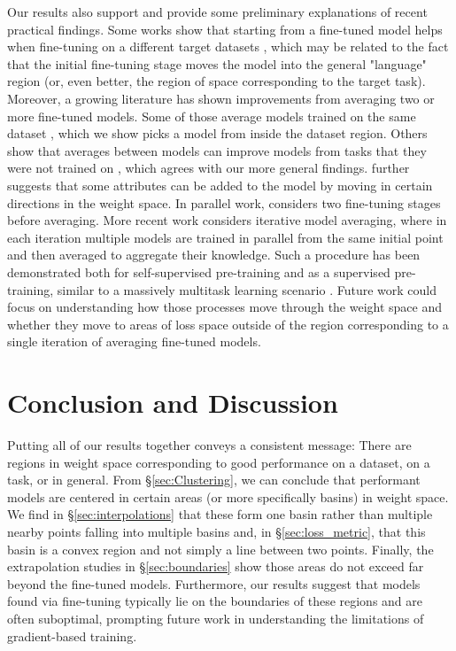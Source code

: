 \documentclass[nohyperref]{article}
\theoremstyle{plain}
\theoremstyle{definition}
\theoremstyle{remark}
\begin{document}
Our results also support and provide some preliminary explanations of recent practical findings. Some works show that starting from a fine-tuned model helps when fine-tuning on a different target datasets \citep{choshen2022start, Phang2018SentenceEO}, which may be related to the fact that the initial fine-tuning stage moves the model into the general "language" region (or, even better, the region of space corresponding to the target task). Moreover, a growing literature has shown improvements from averaging two or more fine-tuned models. Some of those average models trained on the same dataset \citep{Wortsman2022ModelSA,wortsman2022fi}, which we show picks a model from inside the dataset region. Others show that averages between models can improve models from tasks that they were not trained on \citep{choshen2022fusing,matena2021merging}, which agrees with our more general findings. \citet{ilharco2022editing} further suggests that some attributes can be added to the model by moving in certain directions in the weight space. In parallel work, \citet{Rame2022RecyclingDM} considers two fine-tuning stages before averaging.
More recent work considers iterative model averaging, where in each iteration multiple models are trained in parallel from the same initial point and then averaged to aggregate their knowledge. Such a procedure has been demonstrated both for self-supervised pre-training \citep{li2022branch} and as a supervised pre-training, similar to a massively multitask learning scenario \citep{don2022cold}. Future work could focus on understanding how those processes move through the weight space and whether they move to areas of loss space outside of the region corresponding to a single iteration of averaging fine-tuned models. %

\section{Conclusion and Discussion}
Putting all of our results together conveys a consistent message: There are regions in weight space corresponding to good performance on a dataset, on a task, or in general. From \S\ref{sec:Clustering}, we can conclude that performant models are centered in certain areas (or more specifically basins) in weight space. We find in \S\ref{sec:interpolations} that these form one basin rather than multiple nearby points falling into multiple basins and, in \S\ref{sec:loss_metric}, that this basin is a convex region and not simply a line between two points. Finally, the extrapolation studies in \S\ref{sec:boundaries} show those areas do not exceed far beyond the fine-tuned models. Furthermore, our results suggest that models found via fine-tuning typically lie on the boundaries of these regions and are often suboptimal, prompting future work in understanding the limitations of gradient-based training.
\end{document}
